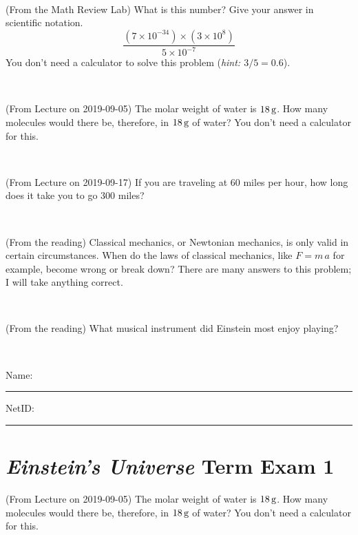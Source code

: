 \documentclass[12pt, letterpaper]{article}
\begin{document}
\vfill ~

\begin{problem} (From the Math Review Lab)
What is this number? Give your answer in scientific notation.
$$
\frac{(7\times10^{-34})\times(3\times10^8)}{5\times10^{-7}}
$$
You don't need a calculator to solve this problem (\textit{hint: $3/5=0.6$}).
\end{problem}


\vfill ~


\clearpage


\begin{problem} (From Lecture on 2019-09-05)
The molar weight of water is $18\,\mathrm{g}$. How many molecules would there
be, therefore, in $18\,\mathrm{g}$ of water? You don't need a calculator for
this.
\end{problem}


\vfill ~

\begin{problem} (From Lecture on 2019-09-17)
If you are traveling at 60 miles per hour, how long does
it take you to go 300 miles?
\end{problem}


\vfill ~

\begin{problem} (From the reading)
Classical mechanics, or Newtonian mechanics, is only valid in certain
circumstances. When do the laws of classical mechanics, like $F =
m\,a$ for example, become wrong or break down? There are many answers
to this problem; I will take anything correct.
\end{problem}


\vfill ~

\begin{problem} (From the reading)
What musical instrument did Einstein most enjoy playing?
\end{problem}


\vfill ~


\cleardoublepage



\noindent
Name: \rule[-1ex]{0.60\textwidth}{0.1pt}
NetID: \rule[-1ex]{0.20\textwidth}{0.1pt}

\section*{\textsl{Einstein's Universe} Term Exam 1}
\setcounter{problem}{1}


\begin{problem} (From Lecture on 2019-09-05)
The molar weight of water is $18\,\mathrm{g}$. How many molecules would there
be, therefore, in $18\,\mathrm{g}$ of water? You don't need a calculator for
this.
\end{problem}
\end{document}

